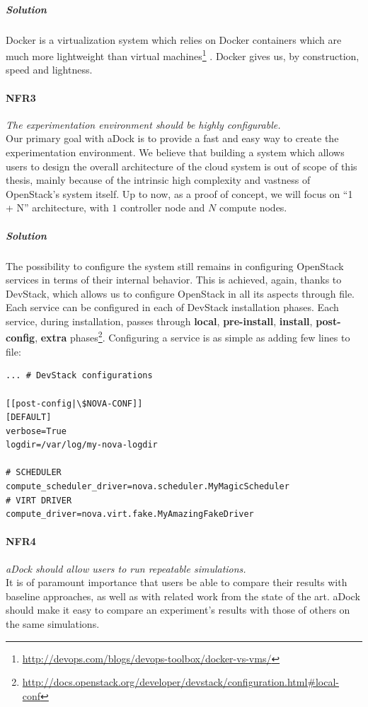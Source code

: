\subparagraph{Solution} Docker is a virtualization system which relies on Docker containers which are much more lightweight than virtual machines\footnote{\url{http://devops.com/blogs/devops-toolbox/docker-vs-vms/}} . Docker gives us, by construction, speed and lightness.

\paragraph{NFR3}\label{p:nfr3} \emph{The experimentation environment should be highly configurable.} \hfill \\
Our primary goal with aDock is to provide a fast and easy way to create the experimentation environment. We believe that building a system which allows users to design the overall architecture of the cloud system is out of scope of this thesis, mainly because of the intrinsic high complexity and vastness of OpenStack's system itself. Up to now, as a proof of concept, we will focus on ``1 + N'' architecture, with $1$ controller node and $N$ compute nodes.

\subparagraph{Solution} The possibility to configure the system still remains in configuring OpenStack services in terms of their internal behavior. This is achieved, again, thanks to DevStack, which allows us to configure OpenStack in all its aspects through  file. Each service can be configured in each of DevStack installation phases. Each service, during installation, passes through \textbf{local}, \textbf{pre-install}, \textbf{install}, \textbf{post-config}, \textbf{extra} phases\footnote{\url{http://docs.openstack.org/developer/devstack/configuration.html\#local-conf}}. Configuring a service is as simple as adding few lines to  file:

\begin{lstlisting}[title=Adding per-service configuration to DevStack's local.conf file]
... # DevStack configurations

[[post-config|\$NOVA-CONF]]
[DEFAULT]
verbose=True
logdir=/var/log/my-nova-logdir

# SCHEDULER
compute_scheduler_driver=nova.scheduler.MyMagicScheduler
# VIRT DRIVER
compute_driver=nova.virt.fake.MyAmazingFakeDriver
\end{lstlisting}


\paragraph{NFR4}\label{p:nfr4} \emph{aDock should allow users to run repeatable simulations.} \hfill \\
It is of paramount importance that users be able to compare their results with baseline approaches, as well as with related work from the state of the art. aDock should make it easy to compare an experiment's results with those of others on the same simulations.

